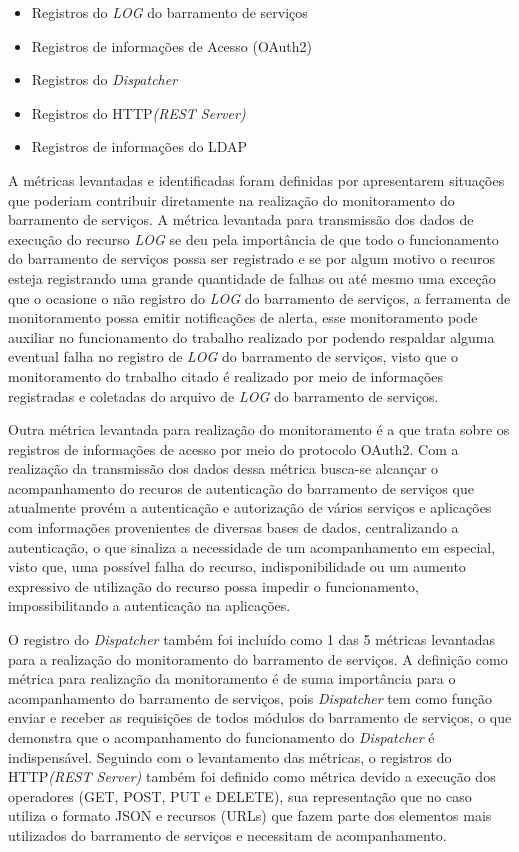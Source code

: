 \begin{itemize}
    \item Registros do \textit{LOG} do barramento de serviços
    \item Registros de informações de Acesso (OAuth2)
    \item Registros do \textit{Dispatcher}
    \item Registros do HTTP\textit{(REST Server)}
    \item Registros de informações do LDAP
\end{itemize}

A métricas levantadas e identificadas foram definidas por apresentarem situações que poderiam contribuir diretamente na realização do monitoramento do barramento de serviços. A métrica levantada para transmissão dos dados de execução do recurso \textit{LOG} se deu pela importância de que todo o funcionamento do barramento de serviços possa ser registrado e se por algum motivo o recuros esteja registrando uma grande quantidade de falhas ou até mesmo uma exceção que o ocasione o não registro do \textit{LOG} do barramento de serviços, a ferramenta de monitoramento possa emitir notificações de alerta, esse monitoramento pode auxiliar no funcionamento do trabalho realizado por \cite{filgueirasmonitoramento} podendo respaldar alguma eventual falha no registro de \textit{LOG} do barramento de serviços, visto que o monitoramento do trabalho citado é realizado por meio de informações registradas e coletadas do arquivo de \textit{LOG} do barramento de serviços. 

Outra métrica levantada para realização do monitoramento é a que trata sobre os registros de informações de acesso por meio do protocolo OAuth2. Com a realização da transmissão dos dados dessa métrica busca-se alcançar o acompanhamento do recuros de autenticação do barramento de serviços que atualmente provém a autenticação e autorização de vários serviços e aplicações com informações provenientes de diversas bases de dados, centralizando a autenticação, o que sinaliza a necessidade de um acompanhamento em especial, visto que, uma possível falha do recurso, indisponibilidade ou um aumento expressivo de utilização do recurso possa impedir o funcionamento, impossibilitando a autenticação na aplicações. 

O registro do \textit{Dispatcher} também foi incluído como  1 das 5 métricas levantadas para a realização do monitoramento do barramento de serviços. A definição como métrica para realização da monitoramento é de suma importância para o acompanhamento do barramento de serviços, pois \textit{Dispatcher} tem como função enviar e receber as requisições de todos módulos do barramento de serviços, o que demonstra que o acompanhamento do funcionamento do \textit{Dispatcher} é indispensável. Seguindo com o levantamento das métricas, o registros do HTTP\textit{(REST Server)} também foi definido como métrica devido a execução dos operadores (GET, POST, PUT e DELETE), sua representação que no caso utiliza o formato \acrshort{JSON} e recursos (URLs) que fazem parte dos elementos mais utilizados do barramento de serviços e necessitam de acompanhamento.


